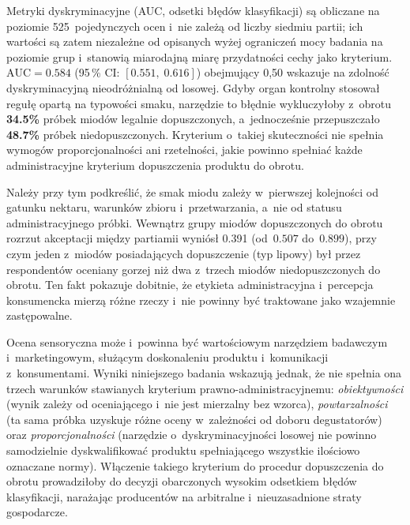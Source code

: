 Metryki dyskryminacyjne (AUC, odsetki błędów klasyfikacji) są obliczane na
poziomie 525~pojedynczych ocen i~nie zależą od liczby siedmiu partii;
ich wartości są zatem niezależne od opisanych wyżej ograniczeń mocy badania
na poziomie grup i~stanowią miarodajną miarę przydatności cechy jako kryterium.
$\mathrm{AUC} = 0.584$ (95\,\% CI: $[0.551,\;0.616]$)
obejmujący 0{,}50 wskazuje na zdolność dyskryminacyjną nieodróżnialną od losowej.
Gdyby organ kontrolny stosował regułę opartą na typowości smaku,
narzędzie to błędnie wykluczyłoby z~obrotu \textbf{34.5\%} próbek miodów
legalnie dopuszczonych, a~jednocześnie przepuszczało
\textbf{48.7\%} próbek niedopuszczonych.
Kryterium o~takiej skuteczności nie spełnia wymogów proporcjonalności
ani rzetelności, jakie powinno spełniać każde administracyjne kryterium
dopuszczenia produktu do obrotu.

Należy przy tym podkreślić, że smak miodu zależy w~pierwszej kolejności od
gatunku nektaru, warunków zbioru i~przetwarzania, a~nie od statusu
administracyjnego próbki.
Wewnątrz grupy miodów dopuszczonych do obrotu rozrzut akceptacji między partiamii
wyniósł 0.391 (od~$0.507$ do~$0.899$),
przy czym jeden z~miodów posiadających dopuszczenie (typ lipowy) był przez
respondentów oceniany gorzej niż dwa z~trzech miodów niedopuszczonych do obrotu.
Ten fakt pokazuje dobitnie, że etykieta administracyjna i~percepcja konsumencka
mierzą różne rzeczy i~nie powinny być traktowane jako wzajemnie zastępowalne.

Ocena sensoryczna może i~powinna być wartościowym narzędziem badawczym
i~marketingowym, służącym doskonaleniu produktu i~komunikacji z~konsumentami.
Wyniki niniejszego badania wskazują jednak, że nie spełnia ona trzech warunków
stawianych kryterium prawno-administracyjnemu: \emph{obiektywności} (wynik zależy
od oceniającego i~nie jest mierzalny bez wzorca), \emph{powtarzalności} (ta sama
próbka uzyskuje różne oceny w~zależności od doboru degustatorów) oraz
\emph{proporcjonalności} (narzędzie o~dyskryminacyjności losowej nie powinno
samodzielnie dyskwalifikować produktu spełniającego wszystkie ilościowo oznaczane
normy). Włączenie takiego kryterium do procedur dopuszczenia do obrotu prowadziłoby
do decyzji obarczonych wysokim odsetkiem błędów klasyfikacji, narażając
producentów na arbitralne i~nieuzasadnione straty gospodarcze.
